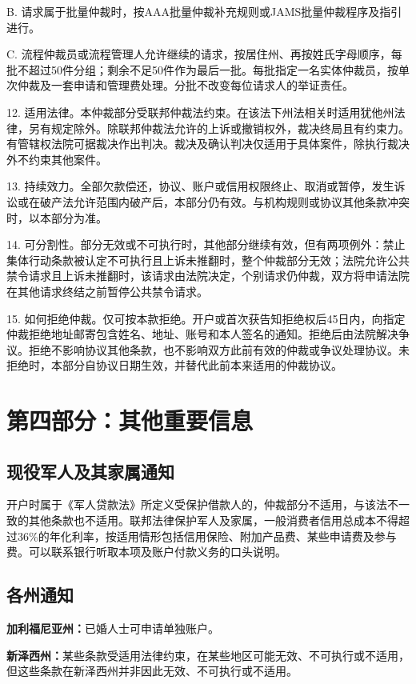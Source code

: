 \documentclass[UTF8,fontset=none,11pt,a4paper]{ctexart}
\begin{document}
B. 请求属于批量仲裁时，按AAA批量仲裁补充规则或JAMS批量仲裁程序及\allowbreak\mbox{指引进行。}


C. 流程仲裁员或流程管理人允许继续的请求，按居住州、再按姓氏字母顺序，每批不超过50件分组；剩余不足50件作为最后一批。每批指定一名实体仲裁员，按单次仲裁及一套申请和管理费处理。分批不改变每位请求人的\allowbreak\mbox{举证责任。}


12. 适用法律。本仲裁部分受联邦仲裁法约束。在该法下州法相关时适用犹他州法律，另有规定除外。除联邦仲裁法允许的上诉或撤销权外，裁决终局且有约束力。有管辖权法院可据裁决作出判决。裁决及确认判决仅适用于具体案件，除执行裁决外不约束\allowbreak\mbox{其他案件。}


13. 持续效力。全部欠款偿还，协议、账户或信用权限终止、取消或暂停，发生诉讼或在破产法允许范围内破产后，本部分仍有效。与机构规则或协议其他条款冲突时，以本\allowbreak\mbox{部分为准。}


14. 可分割性。部分无效或不可执行时，其他部分继续有效，但有两项例外：禁止集体行动条款被认定不可执行且上诉未推翻时，整个仲裁部分无效；法院允许公共禁令请求且上诉未推翻时，该请求由法院决定，个别请求仍仲裁，双方将申请法院在其他请求终结之前暂停公共\allowbreak\mbox{禁令请求。}


15. 如何拒绝仲裁。仅可按本款拒绝。开户或首次获告知拒绝权后45日内，向指定仲裁拒绝地址邮寄包含姓名、地址、账号和本人签名的通知。拒绝后由法院解决争议。拒绝不影响协议其他条款，也不影响双方此前有效的仲裁或争议处理协议。未拒绝时，本部分自协议日期生效，并替代此前本来适用的\allowbreak\mbox{仲裁协议。}


\section*{第四部分：其他重要信息}
\subsection*{现役军人及其家属通知}
开户时属于《军人贷款法》所定义受保护借款人的，仲裁部分不适用，与该法不一致的其他条款也不适用。联邦法律保护军人及家属，一般消费者信用总成本不得超过36\%的年化利率，按适用情形包括信用保险、附加产品费、某些申请费及参与费。可以联系银行听取本项及账户付款义务的\allowbreak\mbox{口头说明。}


\subsection*{各州通知}
\textbf{加利福尼亚州：}已婚人士可申请\allowbreak\mbox{单独账户。}


\textbf{新泽西州：}某些条款受适用法律约束，在某些地区可能无效、不可执行或不适用，但这些条款在新泽西州并非因此无效、不可执行\allowbreak\mbox{或不适用。}
\end{document}
